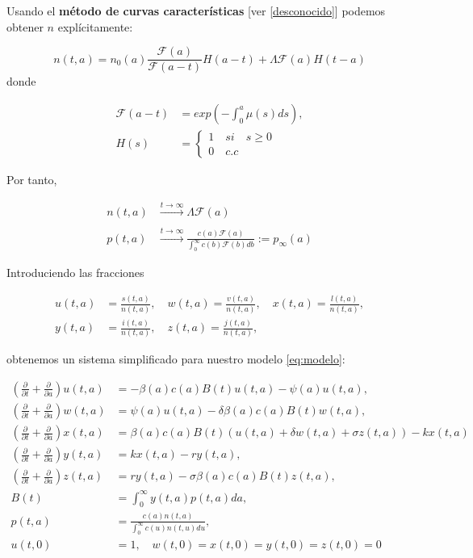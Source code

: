 \documentclass[
]{book}
\begin{document}
Usando el \textbf{método de curvas características} {[}ver \ref{desconocido}{]} podemos obtener \(n\) explícitamente:

\[n(t,a) = n_0(a) \frac{\mathscr{F}(a)}{\mathscr{F}(a-t)} H(a-t) + \Lambda \mathscr{F}(a) H(t-a)\]
donde

\begin{align*}
\mathscr{F}(a-t) &= exp \left( -\int_0^a \mu(s) ds \right) , \\
H(s) &= 
  \begin{cases}
  1 \quad si \quad s \geq 0 \\
  0 \quad  c.c
  \end{cases}
\end{align*}

Por tanto,

\begin{equation}
\begin{split}
n(t,a) &\xrightarrow[]{t \rightarrow \infty} \Lambda \mathscr{F}(a) \\
p(t,a) &\xrightarrow[]{t \rightarrow \infty} \frac{c(a) \mathscr{F}(a)}{\int_0^\infty c(b) \mathscr{F}(b) db} := p_\infty(a)
\end{split}
\label{eq:limites}
\end{equation}

Introduciendo las fracciones

\begin{align*}
u(t,a) &= \frac{s(t,a)}{n(t,a)}, \quad w(t,a) = \frac{v(t,a)}{n(t,a)}, \quad x(t,a) = \frac{l(t,a)}{n(t,a)}, \\
y(t,a) &= \frac{i(t,a)}{n(t,a)}, \quad z(t,a) = \frac{j(t,a)}{n(t,a)}, 
\end{align*}

obtenemos un sistema simplificado para nuestro modelo \eqref{eq:modelo}:

\begin{equation}
\begin{split}
\left(\frac{\partial}{\partial t}+\frac{\partial}{\partial a} \right) u(t,a) &= -\beta(a)c(a)B(t)u(t,a)-\psi(a)u(t,a),                                   \\
\left(\frac{\partial}{\partial t}+\frac{\partial}{\partial a} \right) w(t,a) &= \psi(a)u(t,a)-\delta\beta(a)c(a)B(t)w(t,a) ,                            \\
\left(\frac{\partial}{\partial t}+\frac{\partial}{\partial a} \right) x(t,a) &= \beta(a)c(a)B(t)(u(t,a)+\delta w(t,a) + \sigma z(t,a)) - kx(t,a) \\
\left(\frac{\partial}{\partial t}+\frac{\partial}{\partial a} \right) y(t,a) &= kx(t,a)-ry(t,a),\\
\left(\frac{\partial}{\partial t}+\frac{\partial}{\partial a} \right)z(t,a) &= ry(t,a)-\sigma\beta(a)c(a)B(t)z(t,a),                                    \\
B(t) &= \int_0^\infty y(t,a)p(t,a)da,                            \\
p(t,a) &= \frac{c(a)n(t,a)}{\int_0^\infty c(u)n(t,u)du}, \\
u(t,0) &= 1, \quad w(t,0)=x(t,0)=y(t,0)=z(t,0)=0
\end{split}
\label{eq:modsimp}
\end{equation}
\end{document}
